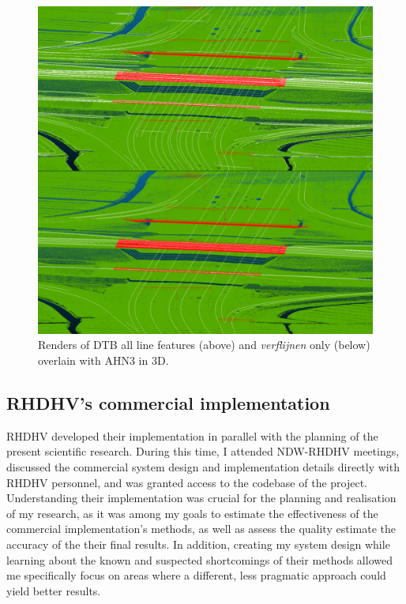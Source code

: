 \begin{figure}
    \centering
    \includegraphics[width=\linewidth]{final_report/figs/ahn_sample_10.png} 
    \caption{Renders of DTB all line features (above) and \textit{verflijnen} only (below) overlain with AHN3 in 3D.}
    \label{fig:dtbahn}
\end{figure}

\subsection{RHDHV's commercial implementation}
\label{sub:commercialproduct}

RHDHV developed their implementation in parallel with the planning of the present scientific research. During this time, I attended NDW-RHDHV meetings, discussed the commercial system design and implementation details directly with RHDHV personnel, and was granted access to the codebase of the project. Understanding their implementation was crucial for the planning and realisation of my research, as it was among my goals to estimate the effectiveness of the commercial implementation's methods, as well as assess the quality estimate the accuracy of the their final results. In addition, creating my system design while learning about the known and suspected shortcomings of their methods allowed me specifically focus on areas where a different, less pragmatic approach could yield better results.

